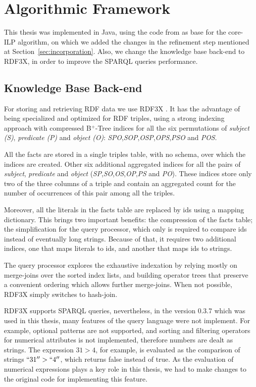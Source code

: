 \chapter{Algorithmic Framework}
\label{af:intro}

This thesis was implemented in Java, using the code from \citet{Teflioudi2011} as base for the core-ILP
algorithm, on which we added the changes in the refinement step mentioned at Section~\ref{sec:incorporation}. Also, we
change the knowledge base back-end to RDF3X, in order to improve the SPARQL queries performance.

\section{Knowledge Base Back-end}

For storing and retrieving RDF data we use RDF3X \citep{Neumann:2010:RES:1731351.1731354}. It has the advantage of being
specialized and optimized for RDF triples, using a strong indexing approach with compressed B$^+$-Tree indices for all
the six permutations of \emph{subject (S)}, \emph{predicate (P)} and \emph{object (O)}:
\emph{SPO},\emph{SOP},\emph{OSP},\emph{OPS},\emph{PSO} and \emph{POS}.

All the facts are stored in a single triples table, with no schema, over which the indices are created. Other six
additional aggregated indices for all the pairs of \emph{subject}, \emph{predicate} and \emph{object}
(\emph{SP},\emph{SO},\emph{OS},\emph{OP},\emph{PS} and \emph{PO}). These indices store only two of the three
columns of a triple and contain an aggregated count for the number of occurrences of this pair among all the triples.

Moreover, all the literals in the facts table are replaced by ids using a mapping dictionary. This brings two important
benefits: the compression of the facts table; the simplification for the query processor, which only is required to
compare ids instead of eventually long strings. Because of that, it requires two additional indices, one that maps
literals to ids, and another that maps ids to strings.

The query processor explores the exhaustive indexation by relying mostly on merge-joins over the sorted index lists, and
building operator trees that preserve a convenient ordering which allows further merge-joins. When not possible,
RDF3X simply switches to hash-join.

RDF3X supports SPARQL queries, nevertheless, in the version 0.3.7 which was used in this thesis, many features of the
query language were not implement. For example, optional patterns are not supported, and sorting and filtering
operators for numerical attributes is not implemented, therefore numbers are dealt as strings. The expression $31>4$,
for example, is evaluated as the comparison of strings $``31''>``4''$, which returns false instead of true. As the
evaluation of numerical expressions plays a key role in this thesis, we had to make changes to the original code
for implementing this feature.


